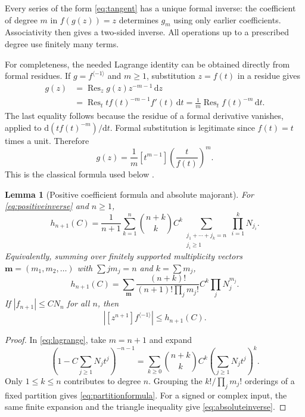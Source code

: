 \documentclass[11pt,a4paper]{article}
\numberwithin{equation}{section}
\newtheorem{lemma}[theorem]{Lemma}
\theoremstyle{definition}
\theoremstyle{remark}
\newcommand{\Res}{\operatorname{Res}}
\newcommand{\inv}[1]{#1^{\langle-1\rangle}}
\newcommand{\dd}{\mathrm d}
\begin{document}
Every series of the form \eqref{eq:tangent} has a unique formal inverse:
the coefficient of degree $m$ in $f(g(z))=z$ determines $g_m$ using only
earlier coefficients. Associativity then gives a two-sided inverse.
All operations up to a prescribed degree use finitely many terms.

For completeness, the needed Lagrange identity can be obtained directly
from formal residues. If $g=\inv f$ and $m\ge1$, substitution $z=f(t)$
in a residue gives
\begin{align*}
 [z^m]g(z)
 &=\Res_z g(z)z^{-m-1}\,\dd z\\
 &=\Res_t t f(t)^{-m-1}f'(t)\,\dd t
  =\frac1m\Res_t f(t)^{-m}\,\dd t.
\end{align*}
The last equality follows because the residue of a formal derivative
vanishes, applied to $\dd(t f(t)^{-m})/\dd t$. Formal substitution is
legitimate since $f(t)=t$ times a unit. Therefore
\begin{equation}
 [z^m]g(z)=\frac1m[t^{m-1}]\left(\frac{t}{f(t)}\right)^m.
 \label{eq:lagrange}
\end{equation}
This is the classical formula used below \cite{gessel}.

\begin{lemma}[Positive coefficient formula and absolute majorant]
\label{lem:lagrange}
For \eqref{eq:positiveinverse} and $n\ge1$,
\begin{equation}
 h_{n+1}(C)=\frac1{n+1}\sum_{k=1}^{n}\binom{n+k}{k}C^k
 \sum_{\substack{j_1+\cdots+j_k=n\\j_i\ge1}}
                         \prod_{i=1}^{k}N_{j_i}.
 \label{eq:orderedformula}
\end{equation}
Equivalently, summing over finitely supported multiplicity vectors
$\boldsymbol m=(m_1,m_2,\ldots)$ with $\sum j m_j=n$ and
$k=\sum m_j$,
\begin{equation}
 h_{n+1}(C)=
 \sum_{\boldsymbol m}
 \frac{(n+k)!}{(n+1)!\prod_jm_j!}
 C^k\prod_j N_j^{m_j}.
 \label{eq:partitionformula}
\end{equation}
If $|f_{n+1}|\le C N_n$ for all $n$, then
\begin{equation}
 |[z^{n+1}]\inv f|\le h_{n+1}(C).
 \label{eq:absoluteinverse}
\end{equation}
\end{lemma}
\begin{proof}
In \eqref{eq:lagrange}, take $m=n+1$ and expand
\[
 \left(1-C\sum_{j\ge1}N_jt^j\right)^{-n-1}
 =\sum_{k\ge0}\binom{n+k}{k}C^k
                  \left(\sum_{j\ge1}N_jt^j\right)^k.
\]
Only $1\le k\le n$ contributes to degree $n$. Grouping the $k!/
\prod_jm_j!$ orderings of a fixed partition gives
\eqref{eq:partitionformula}. For a signed or complex input, the same
finite expansion and the triangle inequality give
\eqref{eq:absoluteinverse}.
\end{proof}
\end{document}
